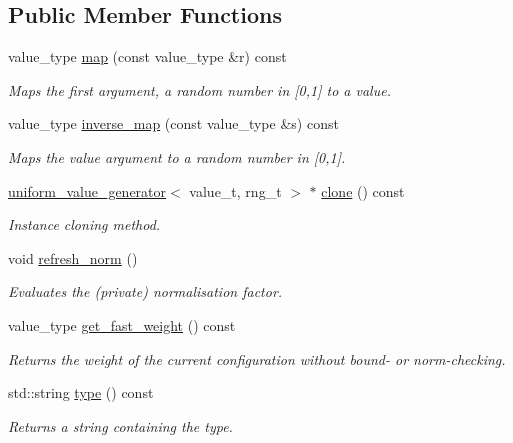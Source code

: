 \subsection*{Public Member Functions}
\begin{DoxyCompactItemize}
\item 
\hypertarget{a00570_a0993c700bdc82105e49d6d5d3f994b65}{}value\+\_\+type \hyperlink{a00570_a0993c700bdc82105e49d6d5d3f994b65}{map} (const value\+\_\+type \&r) const \label{a00570_a0993c700bdc82105e49d6d5d3f994b65}

\begin{DoxyCompactList}\small\item\em Maps the first argument, a random number in \mbox{[}0,1\mbox{]} to a value. \end{DoxyCompactList}\item 
\hypertarget{a00570_acc82a718b279c88880d91ea123879783}{}value\+\_\+type \hyperlink{a00570_acc82a718b279c88880d91ea123879783}{inverse\+\_\+map} (const value\+\_\+type \&s) const \label{a00570_acc82a718b279c88880d91ea123879783}

\begin{DoxyCompactList}\small\item\em Maps the value argument to a random number in \mbox{[}0,1\mbox{]}. \end{DoxyCompactList}\item 
\hyperlink{a00570}{uniform\+\_\+value\+\_\+generator}$<$ value\+\_\+t, rng\+\_\+t $>$ $\ast$ \hyperlink{a00570_a8f41a15f1cb6ef12c60afdfa9f89469a}{clone} () const 
\begin{DoxyCompactList}\small\item\em Instance cloning method. \end{DoxyCompactList}\item 
\hypertarget{a00570_af2d036e9372ed3de619112e15444de65}{}void \hyperlink{a00570_af2d036e9372ed3de619112e15444de65}{refresh\+\_\+norm} ()\label{a00570_af2d036e9372ed3de619112e15444de65}

\begin{DoxyCompactList}\small\item\em Evaluates the (private) normalisation factor. \end{DoxyCompactList}\item 
value\+\_\+type \hyperlink{a00570_acbc47578d709200f3ceb70cc6544ff15}{get\+\_\+fast\+\_\+weight} () const 
\begin{DoxyCompactList}\small\item\em Returns the weight of the current configuration without bound-\/ or norm-\/checking. \end{DoxyCompactList}\item 
\hypertarget{a00570_a91512839a8b91f662545c8ad19883e91}{}std\+::string \hyperlink{a00570_a91512839a8b91f662545c8ad19883e91}{type} () const \label{a00570_a91512839a8b91f662545c8ad19883e91}

\begin{DoxyCompactList}\small\item\em Returns a string containing the type. \end{DoxyCompactList}\end{DoxyCompactItemize}
